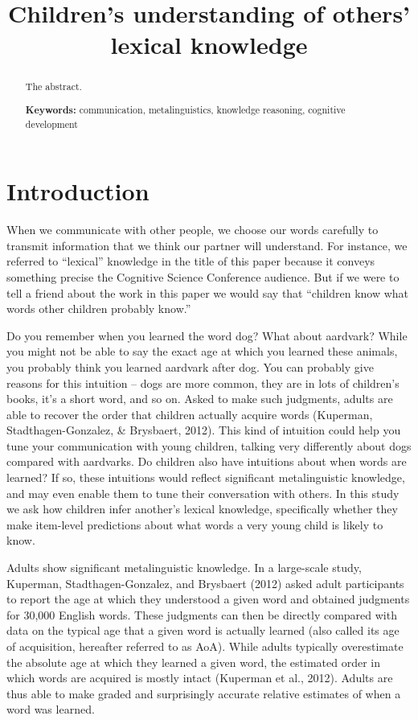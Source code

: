 \documentclass[10pt, letterpaper]{article}
\title{Children's understanding of others' lexical knowledge}
\begin{document}
\maketitle

\begin{abstract}
The abstract.

\textbf{Keywords:}
communication, metalinguistics, knowledge reasoning, cognitive
development
\end{abstract}

\hypertarget{introduction}{%
\section{Introduction}\label{introduction}}

When we communicate with other people, we choose our words carefully to
transmit information that we think our partner will understand. For
instance, we referred to ``lexical'' knowledge in the title of this
paper because it conveys something precise the Cognitive Science
Conference audience. But if we were to tell a friend about the work in
this paper we would say that ``children know what words other children
probably know.''

Do you remember when you learned the word dog? What about aardvark?
While you might not be able to say the exact age at which you learned
these animals, you probably think you learned aardvark after dog. You
can probably give reasons for this intuition -- dogs are more common,
they are in lots of children's books, it's a short word, and so on.
Asked to make such judgments, adults are able to recover the order that
children actually acquire words (Kuperman, Stadthagen-Gonzalez, \&
Brysbaert, 2012). This kind of intuition could help you tune your
communication with young children, talking very differently about dogs
compared with aardvarks. Do children also have intuitions about when
words are learned? If so, these intuitions would reflect significant
metalinguistic knowledge, and may even enable them to tune their
conversation with others. In this study we ask how children infer
another's lexical knowledge, specifically whether they make item-level
predictions about what words a very young child is likely to know.

Adults show significant metalinguistic knowledge. In a large-scale
study, Kuperman, Stadthagen-Gonzalez, and Brysbaert (2012) asked adult
participants to report the age at which they understood a given word and
obtained judgments for 30,000 English words. These judgments can then be
directly compared with data on the typical age that a given word is
actually learned (also called its age of acquisition, hereafter referred
to as AoA). While adults typically overestimate the absolute age at
which they learned a given word, the estimated order in which words are
acquired is mostly intact (Kuperman et al., 2012). Adults are thus able
to make graded and surprisingly accurate relative estimates of when a
word was learned.
\end{document}
